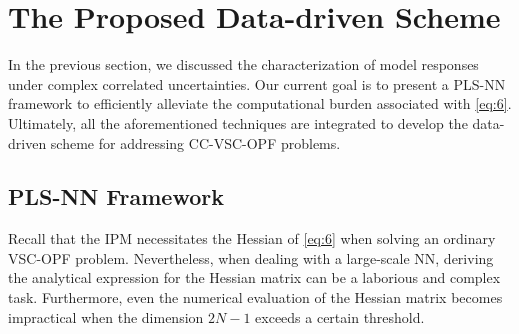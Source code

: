 \documentclass[journal]{IEEEtran}
\theoremstyle{definition}
\theoremstyle{remark}
\begin{document}
\section{The Proposed Data-driven Scheme}\label{scheme}
In the previous section, we discussed the characterization of model responses under complex correlated uncertainties. Our current goal is to present a PLS-NN framework to efficiently alleviate the computational burden associated with \eqref{eq:6}. Ultimately, all the aforementioned techniques are integrated to develop the data-driven scheme for addressing CC-VSC-OPF problems.
\subsection{PLS-NN Framework}
Recall that the IPM necessitates the Hessian of \eqref{eq:6} when solving an ordinary VSC-OPF problem. Nevertheless, when dealing with a large-scale NN, deriving the analytical expression for the Hessian matrix can be a laborious and complex task. Furthermore, even the numerical evaluation of the Hessian matrix becomes impractical when the dimension $2N-1$ exceeds a certain threshold.
\end{document}
